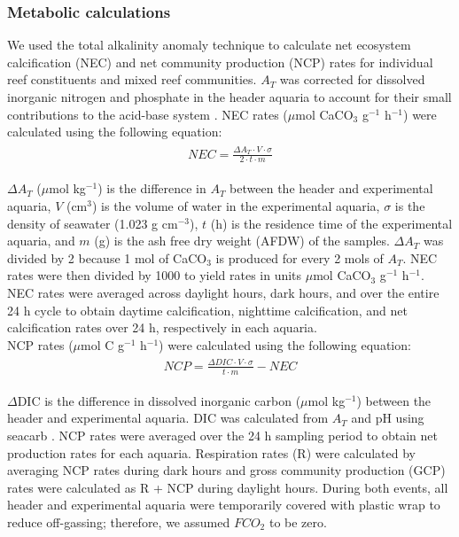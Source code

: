 \documentclass{article}%
\begin{document}
\subsubsection{ Metabolic calculations}
We used the total alkalinity anomaly technique to calculate net ecosystem calcification (NEC) and net community production (NCP) rates for individual reef constituents and mixed reef communities. $A_{T}$ was corrected for dissolved inorganic nitrogen and phosphate in the header aquaria to account for their small contributions to the acid-base system \cite{wolf2007total}. NEC rates ($\mu$mol CaCO$_3$ g$^{-1}$ h$^{-1}$) were calculated using the following equation: 
\begin{align}
\label{1.1}
\begin{split}
NEC  = \frac{\Delta A_{T} \cdot V \cdot \sigma}{2\cdot t\cdot  m}
\end{split}
\end{align}

$\Delta A_{T}$  ($\mu$mol kg$^{-1}$) is the difference in $A_{T}$ between the header and experimental aquaria, $V$  (cm$^{3}$) is the volume of water in the experimental aquaria, $\sigma$ is the density of seawater (1.023 g cm$^{-3}$), $t$  (h) is the residence time of the experimental aquaria, and $m$ (g) is the ash free dry weight (AFDW) of the samples. $\Delta A_{T}$ was divided by 2 because 1 mol of CaCO$_3$ is produced for every 2 mols of $A_{T}$. NEC rates were then divided by 1000 to yield rates in units $\mu$mol CaCO$_3$ g$^{-1}$ h$^{-1}$. NEC rates were averaged across daylight hours, dark hours, and over the entire 24 h cycle to obtain daytime calcification, nighttime calcification, and net calcification rates over 24 h, respectively in each aquaria. \\

NCP rates ($\mu$mol C g$^{-1}$ h$^{-1}$) were calculated using the following equation:
\begin{align}
\label{1.2}
\begin{split}
NCP  = \frac{\Delta DIC \cdot V \cdot \sigma}{t\cdot  m}-NEC
\end{split}
\end{align}

$\Delta$DIC is the difference in dissolved inorganic carbon ($\mu$mol kg$^{-1}$) between the header and experimental aquaria. DIC was calculated from $A_{T}$ and pH using seacarb \cite{gattuso2015seacarb}. NCP rates were averaged over the 24 h sampling period to obtain net production rates for each aquaria. Respiration rates (R) were calculated by averaging NCP rates during dark hours and gross community production (GCP) rates were calculated as R + NCP during daylight hours. During both events, all header and experimental aquaria were temporarily covered with plastic wrap to reduce off-gassing; therefore, we assumed $FCO_2$ to be zero.
\end{document}
